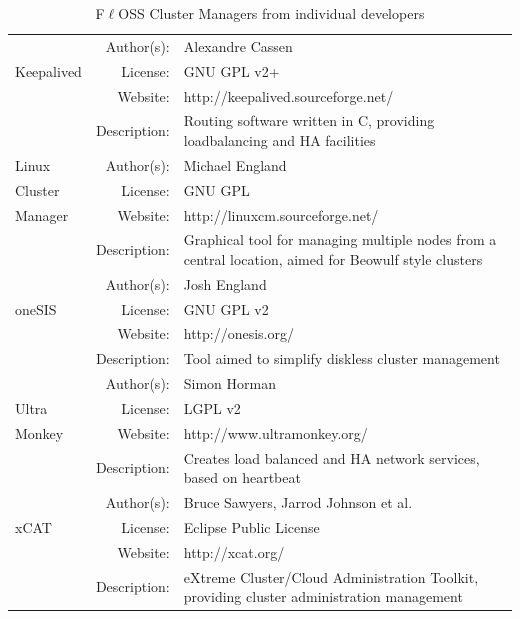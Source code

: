 \documentclass[a4paper, 12pt]{book}
\begin{document}
\begin{table}[H]
  \centering
  \begin{tabular}{ | m{2cm} | r  m{10cm} | }

    \hline    
		 & Author(s): &  Alexandre Cassen\\
      Keepalived & License: &  GNU GPL v2+\\
		 & Website: &  http://keepalived.sourceforge.net/\\
	 	 & Description: & Routing software written in C, providing loadbalancing and HA facilities\\
    \hline
	Linux	 & Author(s): & Michael England \\
	Cluster	 & License: & GNU GPL \\
	Manager	 & Website: & http://linuxcm.sourceforge.net/ \\
	 	 & Description: & Graphical tool for managing multiple nodes from a central location, aimed for Beowulf style clusters \\
    \hline    
		 & Author(s): & Josh England \\
      oneSIS	 & License: & GNU GPL v2 \\
		 & Website: & http://onesis.org/ \\
	 	 & Description: & Tool aimed to simplify diskless cluster management \\  
    \hline    
		 & Author(s): & Simon Horman \\
      Ultra	 & License: & LGPL v2 \\
	Monkey	 & Website: & http://www.ultramonkey.org/ \\
	 	 & Description: & Creates load balanced and HA network services, based on heartbeat \\
    \hline    
		 & Author(s): & Bruce Sawyers, Jarrod Johnson et al. \\
      xCAT	 & License: & Eclipse Public License \\
		 & Website: & http://xcat.org/ \\
	 	 & Description: & eXtreme Cluster/Cloud Administration Toolkit, providing cluster administration management \\
    \hline

  \end{tabular}
\caption{F$\ell$OSS Cluster Managers from individual developers}
\label{table:cluster_managers_individuals}
\end{table}
\end{document}
